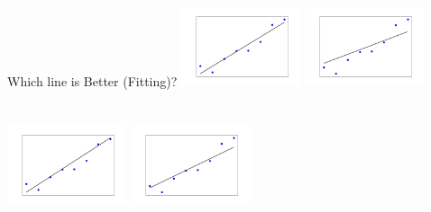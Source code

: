 \documentclass[aspectratio=169,14pt]{beamer}
\begin{document}
\begin{frame}[t]{Which line is Better (Fitting)?}
\vspace{-0.8ex}
\includegraphics[width=3.5cm]{Images/Lin_reg_Pic6.png}    
\hfill
\includegraphics[width=3.5cm]{Images/Lin_reg_Pic7.png} \\
\vspace{-1ex}
 \\

 \\
\vspace{-1ex}
\includegraphics[width=3.5cm]{Images/Lin_reg_Pic8.png}    
\hfill
\includegraphics[width=3.5cm]{Images/Lin_reg_Pic9.png} \\
\vspace{-1ex}
\end{frame}
\end{document}
